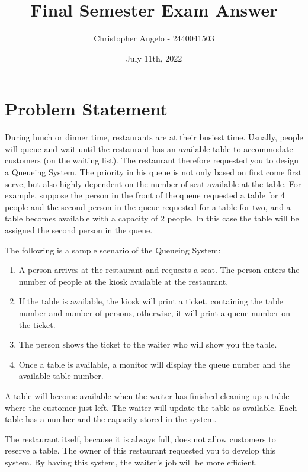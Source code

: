 \documentclass[
  11pt, %
]{assignment}
\author{Christopher Angelo - 2440041503}
\institute{BINUS University\\ Global Class}
\date{July 11th, 2022}
\title{Final Semester Exam Answer}
\begin{document}
\maketitle



\section*{Problem Statement}

\begin{problem}
During lunch or dinner time, restaurants are at their busiest time. Usually, people will queue and wait
until the restaurant has an available table to accommodate customers (on the waiting list). The
restaurant therefore requested you to design a Queueing System. The priority in his queue is not only
based on first come first serve, but also highly dependent on the number of seat available at the table.
For example, suppose the person in the front of the queue requested a table for 4 people and the
second person in the queue requested for a table for two, and a table becomes available with a
capacity of 2 people. In this case the table will be assigned the second person in the queue.

\medskip

The following is a sample scenario of the Queueing System:
\begin{enumerate}[1.]
  \item A person arrives at the restaurant and requests a seat. The person enters the number of people at the kiosk available at the restaurant.
  \item	 If the table is available, the kiosk will print a ticket, containing the table number and number of persons, otherwise, it will print a queue number on the ticket.
  \item	The person shows the ticket to the waiter who will show you the table.
  \item	 Once a table is available, a monitor will display the queue number and the available table number.
\end{enumerate}

\medskip

A table will become available when the waiter has finished cleaning up a table where the customer
just left. The waiter will update the table as available. Each table has a number and the capacity stored
in the system.

\medskip

The restaurant itself, because it is always full, does not allow customers to reserve a table.
The owner of this restaurant requested you to develop this system. By having this system, the waiter's
job will be more efficient.

\end{problem}
\end{document}
